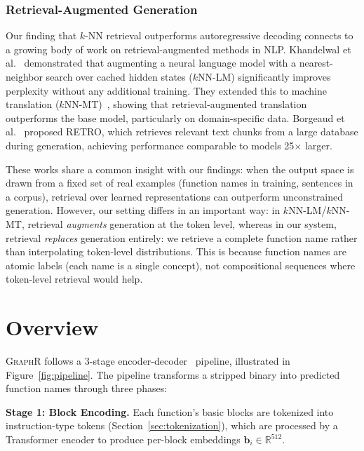 \documentclass[sigconf,nonacm]{acmart}
\newcommand{\sysname}{\textsc{GraphR}}
\begin{document}
\subsubsection{Retrieval-Augmented Generation}

Our finding that $k$-NN retrieval outperforms autoregressive decoding connects to a growing body of work on retrieval-augmented methods in NLP. Khandelwal et al.~\cite{knnlm} demonstrated that augmenting a neural language model with a nearest-neighbor search over cached hidden states ($k$NN-LM) significantly improves perplexity without any additional training. They extended this to machine translation ($k$NN-MT)~\cite{knnmt}, showing that retrieval-augmented translation outperforms the base model, particularly on domain-specific data. Borgeaud et al.~\cite{retro} proposed RETRO, which retrieves relevant text chunks from a large database during generation, achieving performance comparable to models 25$\times$ larger.

These works share a common insight with our findings: when the output space is drawn from a fixed set of real examples (function names in training, sentences in a corpus), retrieval over learned representations can outperform unconstrained generation. However, our setting differs in an important way: in $k$NN-LM/$k$NN-MT, retrieval \emph{augments} generation at the token level, whereas in our system, retrieval \emph{replaces} generation entirely: we retrieve a complete function name rather than interpolating token-level distributions. This is because function names are atomic labels (each name is a single concept), not compositional sequences where token-level retrieval would help.


\section{Overview}
\label{sec:overview}

\sysname{} follows a 3-stage encoder-decoder~\cite{seq2seq} pipeline, illustrated in Figure~\ref{fig:pipeline}. The pipeline transforms a stripped binary into predicted function names through three phases:

\textbf{Stage 1: Block Encoding.} Each function's basic blocks are tokenized into instruction-type tokens (Section~\ref{sec:tokenization}), which are processed by a Transformer encoder to produce per-block embeddings $\mathbf{b}_i \in \mathbb{R}^{512}$.
\end{document}
